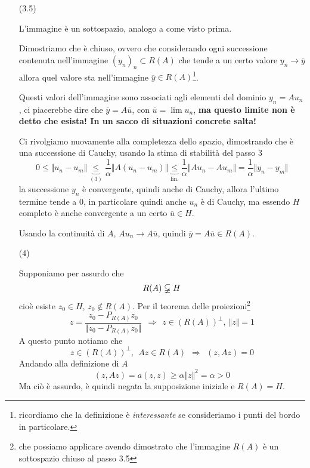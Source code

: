 \documentclass[10pt,a4paper,twoside,openright]{book}
\begin{document}
\begin{dimostrazione}
\begin{itemize}
		\item[(3.5)]

		L'immagine è un sottospazio, analogo a come visto prima.

		Dimostriamo che è chiuso, ovvero che considerando ogni successione contenuta nell'immagine $(y_{n})_{n} \subset R(A)$ che tende a un certo valore $y_{n}\rightarrow \overline{y}$ allora quel valore sta nell'immagine $\overline{y} \in R(A)$\footnote{ricordiamo che la definizione è \textit{interessante} se consideriamo i punti del bordo in particolare.}.

		Questi valori dell'immagine sono associati agli elementi del dominio $y_{n} =Au_{n}$, ci piacerebbe dire che $\overline{y} =A\overline{u}$, con $\overline{u} =\lim u_{n}$, \textbf{ma questo limite non è detto che esista! In un sacco di situazioni concrete salta!}

		Ci rivolgiamo nuovamente alla completezza dello spazio, dimostrando che è una successione di Cauchy, usando la stima di stabilità del passo 3
		\begin{equation*}
			0\leqslant \Vert u_{n} -u_{m}\Vert \underbrace{\leqslant }_{(3)}\frac{1}{\alpha }\Vert A(u_{n} -u_{m})\Vert \underbrace{\leqslant }_{\text{lin.}}\frac{1}{\alpha }\Vert Au_{n} -Au_{m}\Vert =\frac{1}{\alpha }\Vert y_{n} -y_{m}\Vert 
		\end{equation*}
		la successione $y_{n}$ è convergente, quindi anche di Cauchy, allora l'ultimo termine tende a $0$, in particolare quindi anche $u_{n}$ è di Cauchy, ma essendo $H$ completo è anche convergente a un certo $\overline{u} \in H$.

		Usando la continuità di $A$, $Au_{n}\rightarrow A\overline{u}$, quindi $\overline{y} =A\overline{u} \in R(A)$.



		\item[(4)]

		Supponiamo per assurdo che
		\begin{equation*}
			R(A) \varsubsetneqq H
		\end{equation*}
		cioè esiste $z_{0} \in H$, $z_{0} \notin R(A)$. Per il teorema delle proiezioni\footnote{che possiamo applicare avendo dimostrato che l'immagine $R(A)$ è un sottospazio chiuso al passo 3.5}
		\begin{equation*}
			z=\frac{z_{0} -P_{R(A)} z_{0}}{\Vert z_{0} -P_{R(A)} z_{0}\Vert } \ \ \Rightarrow \ \ z\in (R(A))^{\perp },\ \Vert z\Vert =1
		\end{equation*}
		A questo punto notiamo che
		\begin{equation*}
			z\in (R(A))^{\perp },\ \ Az\in R(A) \ \ \Rightarrow \ \ (z,Az) =0
		\end{equation*}
		Andando alla definizione di $A$
		\begin{equation*}
			(z,Az) =a(z,z) \geqslant \alpha \Vert z\Vert ^{2} =\alpha  >0
		\end{equation*}
		Ma ciò è assurdo, è quindi negata la supposizione iniziale e $R(A) =H$.
	\end{itemize}
\end{dimostrazione}
\end{document}
